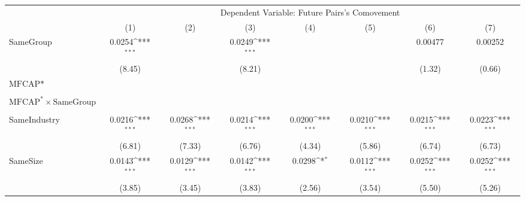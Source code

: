 {
\def\sym#1{\ifmmode^{#1}\else\(^{#1}\)\fi}
\begin{tabular}{l*{7}{c}}
\hline\hline
                &\multicolumn{7}{c}{Dependent Variable:  Future Pairs's Comovement}                                                                  \\\cmidrule(lr){2-8}
                &\multicolumn{1}{c}{(1)}         &\multicolumn{1}{c}{(2)}         &\multicolumn{1}{c}{(3)}         &\multicolumn{1}{c}{(4)}         &\multicolumn{1}{c}{(5)}         &\multicolumn{1}{c}{(6)}         &\multicolumn{1}{c}{(7)}         \\
\hline
SameGroup       &   0.0254\sym{***}&                  &   0.0249\sym{***}&                  &                  &  0.00477         &  0.00252         \\
                &   (8.45)         &                  &   (8.21)         &                  &                  &   (1.32)         &   (0.66)         \\
[1em]
$ \text{MFCAP*} $&                  &                  &                  &                  &                  &                  &                  \\
                &                  &                  &                  &                  &                  &                  &                  \\
[1em]
 $ \text{MFCAP}^* \times {\text{SameGroup} }  $ &                  &                  &                  &                  &                  &                  &                  \\
                &                  &                  &                  &                  &                  &                  &                  \\
[1em]
SameIndustry    &   0.0216\sym{***}&   0.0268\sym{***}&   0.0214\sym{***}&   0.0200\sym{***}&   0.0210\sym{***}&   0.0215\sym{***}&   0.0223\sym{***}\\
                &   (6.81)         &   (7.33)         &   (6.76)         &   (4.34)         &   (5.86)         &   (6.74)         &   (6.73)         \\
[1em]
SameSize        &   0.0143\sym{***}&   0.0129\sym{***}&   0.0142\sym{***}&   0.0298\sym{*}  &   0.0112\sym{***}&   0.0252\sym{***}&   0.0252\sym{***}\\
                &   (3.85)         &   (3.45)         &   (3.83)         &   (2.56)         &   (3.54)         &   (5.50)         &   (5.26)         \\

\end{tabular}}
